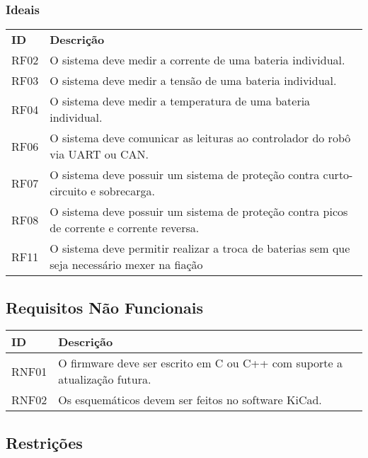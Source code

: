 \documentclass[12pt]{article}
\begin{document}
\subsubsection{Ideais}
\begin{longtable}{|p{}|p{}|}
	\hline
	\textbf{ID} & \textbf{Descrição}                                                                           \\
	RF02        & O sistema deve medir a corrente de uma bateria individual.                                   \\
	\hline
	RF03        & O sistema deve medir a tensão de uma bateria individual.                                     \\
	\hline
	RF04        & O sistema deve medir a temperatura de uma bateria individual.                                \\
	\hline
	RF06        & O sistema deve comunicar as leituras ao controlador do robô via UART ou CAN.                 \\
	\hline
	RF07        & O sistema deve possuir um sistema de proteção contra curto-circuito e sobrecarga.            \\
	\hline
	RF08        & O sistema deve possuir um sistema de proteção contra picos de corrente e corrente reversa.   \\
	\hline
	RF11        & O sistema deve permitir realizar a troca de baterias sem que seja necessário mexer na fiação \\
	\hline
\end{longtable}

\subsection{Requisitos Não Funcionais}

\begin{longtable}{|p{}|p{}|}
	\hline
	\textbf{ID} & \textbf{Descrição}                                                        \\
	\hline
	RNF01       & O firmware deve ser escrito em C ou C++ com suporte a atualização futura. \\
	\hline
	RNF02       & Os esquemáticos devem ser feitos no software KiCad.                       \\
	\hline
\end{longtable}

\newpage

\subsection{Restrições}
\end{document}
